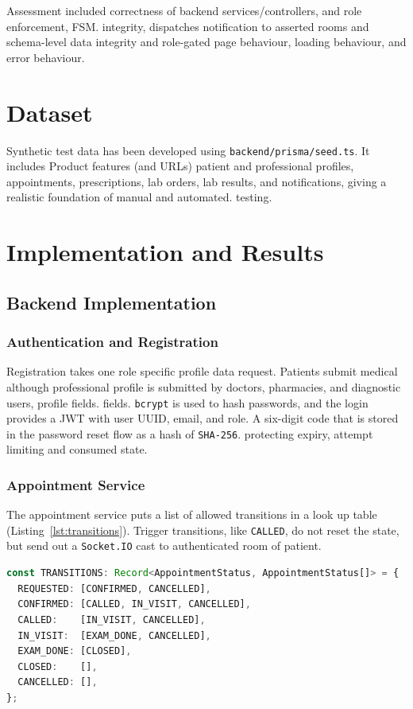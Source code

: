 \documentclass[12pt,a4paper]{report}
\begin{document}
Assessment included correctness of backend services/controllers, and role enforcement, FSM.
integrity, dispatches notification to asserted rooms and schema-level data integrity and
role-gated page behaviour, loading behaviour, and error behaviour.

\section{Dataset}

Synthetic test data has been developed using \texttt{backend/prisma/seed.ts}. It includes
Product features (and URLs) patient and professional profiles, appointments, prescriptions, lab
orders, lab results, and notifications, giving a realistic foundation of manual and automated.
testing.

\section{Implementation and Results}

\subsection{Backend Implementation}

\subsubsection{Authentication and Registration}

Registration takes one role specific profile data request. Patients submit medical
although professional profile is submitted by doctors, pharmacies, and diagnostic users, profile fields.
fields. \texttt{bcrypt} is used to hash passwords, and the login provides a JWT with user UUID,
email, and role. A six-digit code that is stored in the password reset flow as a hash of \texttt{SHA-256}.
protecting expiry, attempt limiting and consumed state.

\subsubsection{Appointment Service}

The appointment service puts a list of allowed transitions in a look up table (Listing~\ref{lst:transitions}).
Trigger transitions, like \texttt{CALLED}, do not reset the state, but send out a \texttt{Socket.IO}
cast to authenticated room of patient.

\begin{lstlisting}[language=TypeScript,caption={Appointment FSM Transition Map},label={lst:transitions}]
const TRANSITIONS: Record<AppointmentStatus, AppointmentStatus[]> = {
  REQUESTED: [CONFIRMED, CANCELLED],
  CONFIRMED: [CALLED, IN_VISIT, CANCELLED],
  CALLED:    [IN_VISIT, CANCELLED],
  IN_VISIT:  [EXAM_DONE, CANCELLED],
  EXAM_DONE: [CLOSED],
  CLOSED:    [],
  CANCELLED: [],
};
\end{lstlisting}
\end{document}

